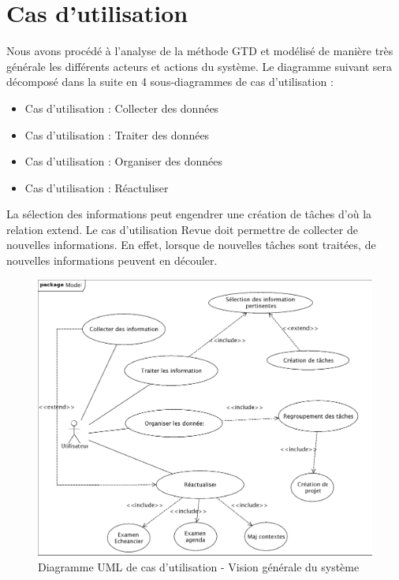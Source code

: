 \chapter{Cas d'utilisation}

Nous avons procédé à l'analyse de la méthode GTD et modélisé de manière très générale les différents acteurs et actions du système. Le diagramme suivant sera décomposé dans la suite en 4 sous-diagrammes de cas d'utilisation :\\


\begin{itemize}

\item Cas d'utilisation : Collecter des données
\item Cas d'utilisation : Traiter des données
\item Cas d'utilisation : Organiser des données
\item Cas d'utilisation : Réactuliser\\

\end{itemize}


La sélection des informations peut engendrer une création de tâches d'où la relation extend.
Le cas d'utilisation Revue doit permettre de collecter de nouvelles informations. En effet, lorsque de nouvelles tâches sont traitées, de nouvelles informations peuvent en découler.



\begin{figure}[H]
\begin{center}
\includegraphics[scale=0.4,angle=90]{diagrams/UseCase.png}
\caption{Diagramme UML de cas d'utilisation - Vision générale du système}
\end{center}
\end{figure}









